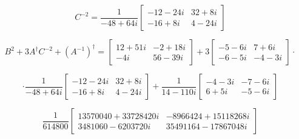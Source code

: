 \documentclass{article}
\begin{document}
\begin{equation}
C^{-2}=
\frac{1}{-48+64i}
\begin{bmatrix}
-12-24i & 32 +8i \\
-16 +8i & 4 -24i
\end{bmatrix}\nonumber
\end{equation}


\begin{equation}
B^2+3A ^{\dag} C^{-2}+(A^{-1})^{\dag}=
\begin{bmatrix}
12+51i & -2+18i\\
-4i & 56-39i
\end{bmatrix}
+3
\begin{bmatrix}
-5-6i & 7+6i\\
 -6-5i & -4-3i
\end{bmatrix}
\cdot\nonumber
\end{equation}    


\begin{equation}
\cdot
\frac{1}{-48+64i}
\begin{bmatrix}
-12-24i & 32 +8i \\
-16 +8i & 4 -24i
\end{bmatrix}
+
\frac{1}{14-110i}
\begin{bmatrix}
 -4-3i & -7-6i\\
 6+5i & -5-6i
\end{bmatrix}\nonumber
\end{equation}   


\begin{equation}
\frac{1}{614800}
\begin{bmatrix}
13570040 + 33728420i & -8966424 + 15118268i \\
3481060 - 6203720i & 35491164 - 17867048i\nonumber
\end{bmatrix}
\end{equation}






\pagebreak 
\end{document}
